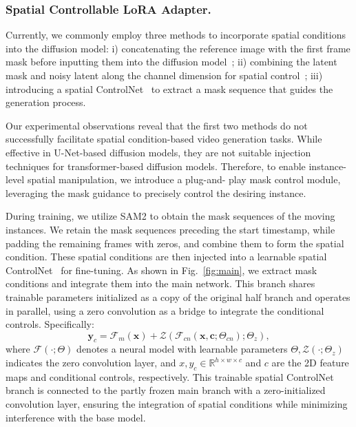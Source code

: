 \subsubsection{\textbf{Spatial Controllable LoRA Adapter.}}
Currently, we commonly employ three methods to incorporate spatial conditions into the diffusion model:
i) concatenating the reference image with the first frame mask before inputting them into the diffusion model~\cite{ma2024follow}; ii) combining the latent mask and noisy latent along the channel dimension for spatial control~\cite{lei2024animateanything}; iii) introducing a spatial ControlNet~\cite{zhang2023adding} to extract a mask sequence that guides the generation process.

Our experimental observations reveal that the first two methods do not successfully facilitate spatial condition-based video generation tasks. While effective in U-Net-based diffusion models, they are not suitable injection techniques for transformer-based diffusion models.
Therefore, to enable instance-level spatial manipulation, we introduce a plug-and-
play mask control module, leveraging the mask guidance to precisely control the desiring instance. 


During training, we utilize SAM2 to obtain the mask sequences of the moving instances. We retain the mask sequences preceding the start timestamp, while padding the remaining frames with zeros, and combine them to form the spatial condition. These spatial conditions are then injected into a learnable spatial ControlNet~\cite{zhang2023adding} for fine-tuning. As shown in Fig.~\ref{fig:main}, we extract mask conditions and integrate them into the main network. This branch shares trainable parameters initialized as a copy of the original half branch and operates in parallel, using a zero convolution as a bridge to integrate the conditional controls. Specifically:
\begin{equation}
    \boldsymbol{y}_c=\mathcal{F}_m(\boldsymbol{x})+\mathcal{Z}(\mathcal{F}_{cn}(\boldsymbol{x},\boldsymbol{c};\Theta_{cn});\Theta_z),
\end{equation}
where $\mathcal{F}(\cdot;\Theta)$ denotes a neural model with learnable parameters $\Theta,\mathcal{Z}(\cdot;\Theta_{z})$ indicates the zero convolution layer, and $x,y_{c}\in\mathbb{R}^{h\times w\times c}$ and $c$ are the 2D feature maps and conditional controls, respectively. This trainable spatial ControlNet branch is connected to the partly frozen main branch with a zero-initialized convolution layer, ensuring the integration of spatial conditions while minimizing interference with the base model.

